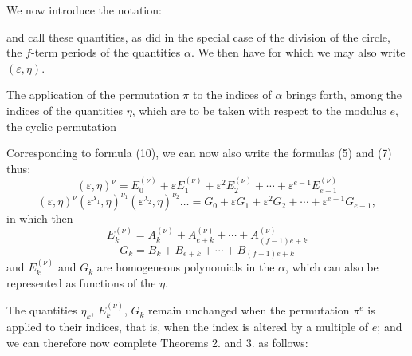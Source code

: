 
We now introduce the notation:

and call these quantities, as  did in the special case of the division of the circle, the $f$-term periods of the quantities $\alpha$. We then have
for which we may also write $(\varepsilon,\eta)$.

The application of the permutation $\pi$ to the indices of $\alpha$ brings forth, among the indices of the quantities $\eta$, which are to be taken with respect to the modulus $e$, the cyclic permutation

Corresponding to formula (10), we can now also write the formulas (5) and (7) thus:
\[
(\varepsilon,\eta)^{\nu} = E_0^{(\nu)} + \varepsilon E_1^{(\nu)} + \varepsilon^2 E_2^{(\nu)} + \cdots + \varepsilon^{e-1}E_{e-1}^{(\nu)}
\]
\[
(\varepsilon,\eta)^{\nu}(\varepsilon^{\lambda_1},\eta)^{\nu_1}(\varepsilon^{\lambda_2},\eta)^{\nu_2}\dots = G_0 + \varepsilon G_1 + \varepsilon^2 G_2 + \cdots + \varepsilon^{e-1}G_{e-1},
\]
in which then
\[
E_k^{(\nu)} = A_k^{(\nu)} + A_{e+k}^{(\nu)} + \cdots + A_{(f-1)e+k}^{(\nu)}
\]
\[
G_k = B_k + B_{e+k} + \cdots + B_{(f-1)e+k}
\]
and $E_k^{(\nu)}$ and $G_k$ are homogeneous polynomials in the $\alpha$, which can also be represented as functions of the $\eta$.

The quantities $\eta_k$, $E_k^{(\nu)}$, $G_k$ remain unchanged when the permutation $\pi^e$ is applied to their indices, that is, when the index is altered by a multiple of $e$; and we can therefore now complete Theorems 2. and 3. as follows:

